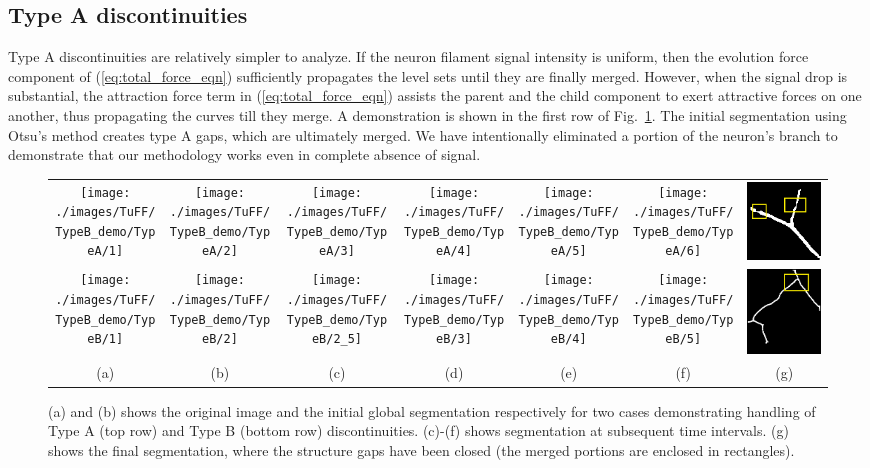 \subsection{Type A discontinuities}
Type A discontinuities are relatively simpler to analyze. If the neuron filament signal intensity is uniform, then the evolution force component of (\ref{eq:total_force_eqn}) sufficiently propagates the level sets until they are finally merged. However, when the signal drop is substantial, the attraction force term in (\ref{eq:total_force_eqn}) assists the parent and the child component to exert attractive forces on one another, thus propagating the curves till they merge. A demonstration is shown in the first row of Fig.~\ref{fig:typeAB_demo}. The initial segmentation using Otsu's method creates type A gaps, which are ultimately merged. We have intentionally eliminated a portion of the neuron's branch to demonstrate that our methodology works even in complete absence of signal. 

\begin{figure}[t]
\centering
\renewcommand{\tabcolsep}{0.02cm}
\begin{tabular}{ccccccc}
	\texttt{[image: ./images/TuFF/TypeB\_demo/TypeA/1]} &
	\texttt{[image: ./images/TuFF/TypeB\_demo/TypeA/2]} &
	\texttt{[image: ./images/TuFF/TypeB\_demo/TypeA/3]} &
	\texttt{[image: ./images/TuFF/TypeB\_demo/TypeA/4]} &
	\texttt{[image: ./images/TuFF/TypeB\_demo/TypeA/5]} &
	\texttt{[image: ./images/TuFF/TypeB\_demo/TypeA/6]} &
	\includegraphics[width=.14\linewidth]{./images/TuFF/TypeB_demo/TypeA/converged} 
	\\
	\texttt{[image: ./images/TuFF/TypeB\_demo/TypeB/1]} &
	\texttt{[image: ./images/TuFF/TypeB\_demo/TypeB/2]} &
	\texttt{[image: ./images/TuFF/TypeB\_demo/TypeB/2\_5]} &
	\texttt{[image: ./images/TuFF/TypeB\_demo/TypeB/3]} &
	\texttt{[image: ./images/TuFF/TypeB\_demo/TypeB/4]} &
	\texttt{[image: ./images/TuFF/TypeB\_demo/TypeB/5]} &
	\includegraphics[width=.14\linewidth]{./images/TuFF/TypeB_demo/TypeB/converged} \\
	\scriptsize (a)	& 	\scriptsize (b) & 	\scriptsize (c)	& 	\scriptsize (d) &	\scriptsize (e)	& 	\scriptsize (f) &   \scriptsize (g)
\end{tabular}
\caption[TuFF performance with discontinuities]{(a) and (b) shows the original image and the initial global segmentation respectively for two cases demonstrating handling of Type A (top row) and Type B (bottom row) discontinuities. (c)-(f) shows segmentation at subsequent time intervals. (g) shows the final segmentation, where the structure gaps have been closed (the merged portions are enclosed in rectangles). }
\label{fig:typeAB_demo}
\end{figure}
